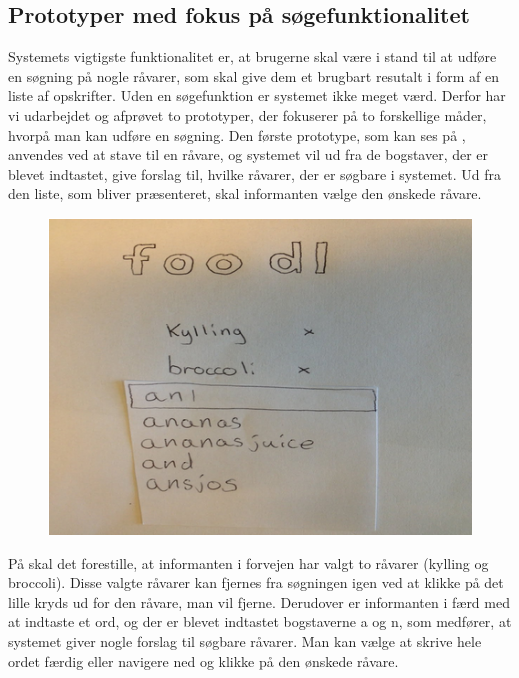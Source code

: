 \subsection{Prototyper med fokus på søgefunktionalitet}
\label{subsec:prototype1}

Systemets vigtigste funktionalitet er, at brugerne skal være i stand til at udføre en søgning på nogle råvarer, som skal give dem et brugbart resutalt i form af en liste af opskrifter. Uden en søgefunktion er systemet ikke meget værd. Derfor har vi udarbejdet og afprøvet to prototyper, der fokuserer på to forskellige måder, hvorpå man kan udføre en søgning. Den første prototype, som kan ses på , anvendes ved at stave til en råvare, og systemet vil ud fra de bogstaver, der er blevet indtastet, give forslag til, hvilke råvarer, der er søgbare i systemet. Ud fra den liste, som bliver præsenteret, skal informanten vælge den ønskede råvare.

\begin{figure}[H]
	\centering
	\includegraphics[scale=0.7]{billeder/prototyper/prototype1a.png}
	\label{fig:prototype1adesign}
\end{figure}

På  skal det forestille, at informanten i forvejen har valgt to råvarer (kylling og broccoli). Disse valgte råvarer kan fjernes fra søgningen igen ved at klikke på det lille kryds ud for den råvare, man vil fjerne. Derudover er informanten i færd med at indtaste et ord, og der er blevet indtastet bogstaverne a og n, som medfører, at systemet giver nogle forslag til søgbare råvarer. Man kan vælge at skrive hele ordet færdig eller navigere ned og klikke på den ønskede råvare.

